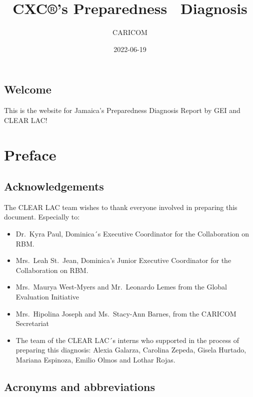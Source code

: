 \documentclass[
  10pt,
]{book}
\title{CXC®'s Preparedness ~Diagnosis}
\author{CARICOM}
\date{2022-06-19}
\begin{document}
\maketitle

{
\setcounter{tocdepth}{1}
\tableofcontents
}
\hypertarget{welcome}{%
\chapter*{Welcome}\label{welcome}}

This is the website for Jamaica's Preparedness Diagnosis Report by GEI and CLEAR LAC!

\hypertarget{part-preface}{%
\part{Preface}\label{part-preface}}

\hypertarget{acknowledgements}{%
\chapter*{Acknowledgements}\label{acknowledgements}}

The CLEAR LAC team wishes to thank everyone involved in preparing this document. Especially to:

\begin{itemize}
\item
  Dr.~Kyra Paul, Dominica´s Executive Coordinator for the Collaboration on RBM.
\item
  Mrs.~Leah St.~Jean, Dominica's Junior Executive Coordinator for the Collaboration on RBM.
\item
  Mrs.~Maurya West-Myers and Mr.~Leonardo Lemes from the Global Evaluation Initiative
\item
  Mrs.~Hipolina Joseph and Ms.~Stacy-Ann Barnes, from the CARICOM Secretariat
\item
  The team of the CLEAR LAC´s interns who supported in the process of preparing this diagnosis: Alexia Galarza, Carolina Zepeda, Gisela Hurtado, Mariana Espinoza, Emilio Olmos and Lothar Rojas.
\end{itemize}

\hypertarget{acronyms-and-abbreviations}{%
\chapter*{Acronyms and abbreviations}\label{acronyms-and-abbreviations}}
\end{document}
